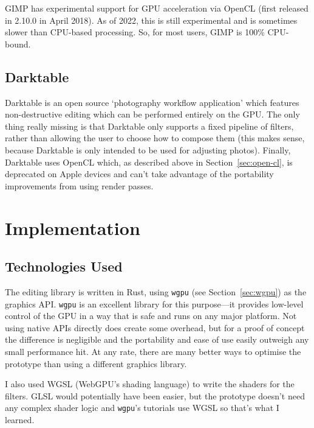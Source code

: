 \documentclass[12pt]{article}
\begin{document}
GIMP has experimental support for GPU acceleration via OpenCL (first released in 2.10.0
\cite{gimp-2.10} in April 2018).  As of 2022, this is still experimental and is sometimes slower
than CPU-based processing.  So, for most users, GIMP is 100\% CPU-bound.

\subsection{Darktable}

Darktable \cite{darktable} is an open source `photography workflow application'
which features non-destructive editing which can be performed entirely on the GPU.  The only thing
really missing is that Darktable only supports a fixed pipeline of filters, rather than allowing the
user to choose how to compose them (this makes sense, because Darktable is only intended to be used
for adjusting photos).  Finally, Darktable uses OpenCL which, as described above in
Section~\ref{sec:open-cl}, is deprecated on Apple devices and can't take advantage of the
portability improvements from using render passes.



\pagebreak

\section{Implementation}\label{sec:implementation}

\subsection{Technologies Used}

The editing library is written in Rust, using \verb|wgpu| (see Section~\ref{sec:wgpu}) as the
graphics API\@.  \verb|wgpu| is an excellent library for this purpose---it provides low-level
control of the GPU in a way that is safe and runs on any major platform.  Not using native APIs
directly does create some overhead, but for a proof of concept the difference is negligible and the
portability and ease of use easily outweigh any small performance hit.  At any rate, there are many
better ways to optimise the prototype than using a different graphics library.

I also used WGSL (WebGPU's shading language) to write the shaders for the filters.  GLSL would
potentially have been easier, but the prototype doesn't need any complex shader logic and
\verb|wgpu|'s tutorials use WGSL so that's what I learned.
\end{document}
